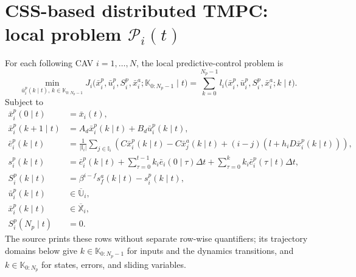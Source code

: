 \documentclass{article}
\begin{document}
\section*{CSS-based distributed TMPC: local problem $\mathscr P_i(t)$}
For each following CAV $i=1,\ldots,N$, the local predictive-control problem is
\begin{equation}
\min_{\bar u_i^p(k\mid t),\,k\in\mathbb K_{0:N_p-1}}
J_i\bigl(\bar x_i^p,\bar u_i^p,S_i^p,\bar x_i^a;\mathbb K_{0:N_p-1}\mid t\bigr)
=\sum_{k=0}^{N_p-1}l_i\bigl(\bar x_i^p,\bar u_i^p,S_i^p,\bar x_i^a;k\mid t\bigr).
\tag{14a}
\end{equation}
Subject to
\begin{align}
\bar x_i^p(0\mid t)&=\bar x_i(t),\tag{14b}\\
\bar x_i^p(k+1\mid t)&=A_d\bar x_i^p(k\mid t)+B_d\bar u_i^p(k\mid t),\tag{14c}\\
\bar e_i^p(k\mid t)&=\frac{1}{|\mathbb I_i|}\sum_{j\in\mathbb I_i}
\left(C\bar x_i^p(k\mid t)-C\bar x_j^a(k\mid t)
 +(i-j)\left(l+h_iD\bar x_i^p(k\mid t)\right)\right),\tag{14d}\\
s_i^p(k\mid t)&=\bar e_i^p(k\mid t)
 +\sum_{\tau=0}^{t-1}k_i\bar e_i(0\mid\tau)\Delta t
 +\sum_{\tau=0}^{k}k_i\bar e_i^p(\tau\mid t)\Delta t,\tag{14e}\\
S_i^p(k\mid t)&=\beta^{i-f}s_f^a(k\mid t)-s_i^p(k\mid t),\tag{14f}\\
\bar u_i^p(k\mid t)&\in\overline{\mathbb U}_i,\tag{14g}\\
\bar x_i^p(k\mid t)&\in\overline{\mathbb X}_i,\tag{14h}\\
S_i^p(N_p\mid t)&=0.\tag{14i}
\end{align}
The source prints these rows without separate row-wise quantifiers; its trajectory domains below give $k\in\mathbb K_{0:N_p-1}$ for inputs and the dynamics transitions, and $k\in\mathbb K_{0:N_p}$ for states, errors, and sliding variables.
\end{document}
